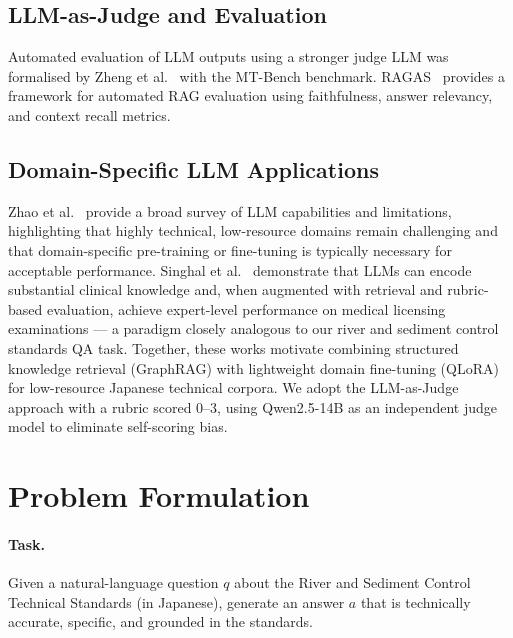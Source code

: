 \documentclass[twocolumn]{article}
\begin{document}
\subsection{LLM-as-Judge and Evaluation}

Automated evaluation of LLM outputs using a stronger judge LLM was formalised by
Zheng et al.~\cite{zheng2023judging} with the MT-Bench benchmark.
RAGAS~\cite{es2023ragas} provides a framework for automated RAG evaluation using
faithfulness, answer relevancy, and context recall metrics.

\subsection{Domain-Specific LLM Applications}

Zhao et al.~\cite{zhao2023llmsurvey} provide a broad survey of LLM capabilities and
limitations, highlighting that highly technical, low-resource domains remain challenging
and that domain-specific pre-training or fine-tuning is typically necessary for acceptable
performance.
Singhal et al.~\cite{singhal2023med} demonstrate that LLMs can encode substantial clinical
knowledge and, when augmented with retrieval and rubric-based evaluation, achieve
expert-level performance on medical licensing examinations — a paradigm closely analogous
to our river and sediment control standards QA task.
Together, these works motivate combining structured knowledge retrieval (GraphRAG) with
lightweight domain fine-tuning (QLoRA) for low-resource Japanese technical corpora.
We adopt the LLM-as-Judge approach with a rubric scored 0--3, using Qwen2.5-14B as an
independent judge model to eliminate self-scoring bias.

\section{Problem Formulation}
\label{sec:problem}

\paragraph{Task.}
Given a natural-language question $q$ about the River and Sediment Control Technical Standards
(in Japanese), generate an answer $a$ that is technically accurate, specific, and grounded in
the standards.
\end{document}
